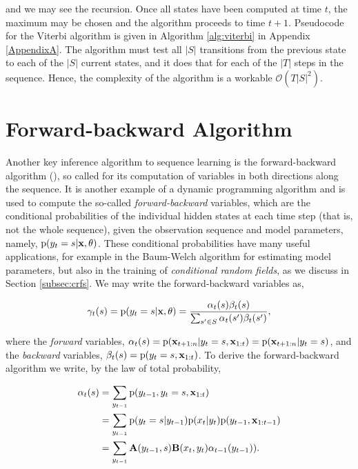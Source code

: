 and we may see the recursion. Once all states have been computed at time $t$, the maximum may be chosen and the algorithm proceeds to time $t+1$. Pseudocode for the Viterbi algorithm is given in Algorithm \ref{alg:viterbi} in Appendix \ref{AppendixA}. The algorithm must test all $|S|$ transitions from the previous state to each of the $|S|$ current states, and it does that for each of the $|T|$ steps in the sequence. Hence, the complexity of the algorithm is a workable $\mathcal{O}(T|S|^2)$.

\section{Forward-backward Algorithm}
\label{sec:fb}

Another key inference algorithm to sequence learning is the forward-backward algorithm (\cite{binder1997space}), so called for its computation of variables in both directions along the sequence. It is another example of a dynamic programming algorithm and is used to compute the so-called \emph{forward-backward} variables, which are the conditional probabilities of the individual hidden states at each time step (that is, not the whole sequence), given the observation sequence and model parameters, namely, $\text{p}(y_t = s | \mathbf{x}, \theta)$. These conditional probabilities have many useful applications, for example in the Baum-Welch algorithm for estimating model parameters, but also in the training of \emph{conditional random fields}, as we discuss in Section \ref{subsec:crfs}. We may write the forward-backward variables as,

\begin{equation}
\gamma_t(s) = \text{p}(y_t = s | \mathbf{x}, \theta) = \frac{\alpha_t(s) \beta_t(s)}{\sum_{s' \in S} \alpha_t(s') \beta_t(s')},
\label{eq:fb}
\end{equation}

where the \emph{forward} variables, $\alpha_t(s) = \text{p}(\mathbf{x}_{t+1:n}|y_t = s, \mathbf{x}_{1:t}) = \text{p}(\mathbf{x}_{t+1:n}|y_t = s)$, and the \emph{backward} variables, $\beta_t(s) = \text{p}(y_t = s, \mathbf{x}_{1:t})$. To derive the forward-backward algorithm we write, by the law of total probability,

\begin{equation}
\begin{aligned}
\alpha_t(s) &= \sum_{y_{t-1}} \text{p}(y_{t-1}, y_t = s, \mathbf{x}_{1:t}) \\
& = \sum_{y_{t-1}} \text{p}(y_t = s|y_{t-1}) \text{p}(x_t|y_t) \text{p}(y_{t-1}, \mathbf{x}_{1:t-1}) \\
& = \sum_{y_{t-1}} \mathbf{A}(y_{t-1}, s) \mathbf{B}(x_t, y_t) \alpha_{t-1}(y_{t-1})).
\end{aligned}
\label{eq:forward}
\end{equation}

